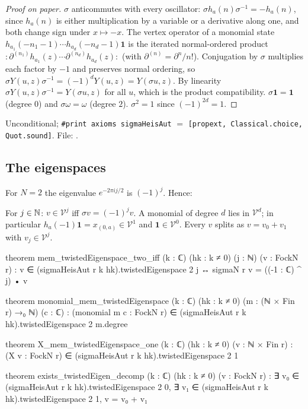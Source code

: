 \begin{proof}[Proof on paper]
$\sigma$ anticommutes with every oscillator: $\sigma h_a(n)\sigma^{-1} = -h_a(n)$, since
$h_a(n)$ is either multiplication by a variable or a derivative along one, and both change sign
under $x\mapsto -x$. The vertex operator of a monomial state $h_{a_1}(-n_1-1)\cdots
h_{a_d}(-n_d-1)\mathbf 1$ is the iterated normal-ordered product
${:}\partial^{(n_1)}h_{a_1}(z)\cdots\partial^{(n_d)}h_{a_d}(z){:}$ (with
$\partial^{(n)} = \partial^n/n!$). Conjugation by $\sigma$ multiplies each factor by $-1$ and
preserves normal ordering, so $\sigma Y(u,z)\sigma^{-1} = (-1)^dY(u,z) = Y(\sigma u,z)$. By
linearity $\sigma Y(u,z)\sigma^{-1} = Y(\sigma u, z)$ for all $u$, which is the product
compatibility. $\sigma\mathbf1=\mathbf1$ (degree $0$) and $\sigma\omega = \omega$ (degree $2$).
$\sigma^2=1$ since $(-1)^{2d}=1$.
\end{proof}

\begin{status}
Unconditional; \verb|#print axioms sigmaHeisAut| $=$ \texttt{[propext, Classical.choice,
Quot.sound]}. File: .
\end{status}

\subsection{The eigenspaces}

For $N=2$ the eigenvalue $e^{-2\pi ij/2}$ is $(-1)^j$. Hence:

\begin{proposition}\label{ch07:prop:eigen}
For $j\in{\mathbb{N}}$: $v\in\mathcal V^j$ iff $\sigma v = (-1)^jv$. A monomial of degree $d$ lies in
$\mathcal V^d$; in particular $h_a(-1)\mathbf 1 = x_{(0,a)}\in\mathcal V^1$ and
$\mathbf 1\in\mathcal V^0$. Every $v$ splits as $v = v_0+v_1$ with $v_j\in\mathcal V^j$.
\end{proposition}

\begin{leancode}
theorem mem_twistedEigenspace_two_iff (k : ℂ) (hk : k ≠ 0) (j : ℕ) (v : FockN r) :
    v ∈ (sigmaHeisAut r k hk).twistedEigenspace 2 j ↔ sigmaN r v = ((-1 : ℂ) ^ j) • v

theorem monomial_mem_twistedEigenspace (k : ℂ) (hk : k ≠ 0) (m : (ℕ × Fin r) →₀ ℕ) (c : ℂ) :
    (monomial m c : FockN r) ∈ (sigmaHeisAut r k hk).twistedEigenspace 2 m.degree

theorem X_mem_twistedEigenspace_one (k : ℂ) (hk : k ≠ 0) (v : ℕ × Fin r) :
    (X v : FockN r) ∈ (sigmaHeisAut r k hk).twistedEigenspace 2 1

theorem exists_twistedEigen_decomp (k : ℂ) (hk : k ≠ 0) (v : FockN r) :
    ∃ v₀ ∈ (sigmaHeisAut r k hk).twistedEigenspace 2 0,
      ∃ v₁ ∈ (sigmaHeisAut r k hk).twistedEigenspace 2 1, v = v₀ + v₁
\end{leancode}

